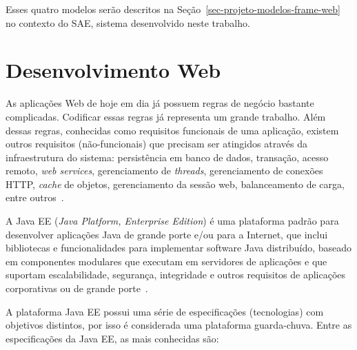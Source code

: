 Esses quatro modelos serão descritos na Seção~\ref{sec-projeto-modelos-frame-web} no contexto do SAE, sistema desenvolvido neste trabalho.







\section{Desenvolvimento Web}
\label{sec-referencial-desenvolvimento-web}

As aplicações Web de hoje em dia já possuem regras de negócio bastante complicadas. Codificar essas regras já representa um grande trabalho. Além dessas regras, conhecidas como requisitos funcionais de uma aplicação, existem outros requisitos (não-funcionais) que precisam ser atingidos através da infraestrutura do sistema: persistência em banco de dados, transação, acesso remoto, \textit{web services}, gerenciamento de \textit{threads}, gerenciamento de conexões HTTP, \textit{cache} de objetos, gerenciamento da sessão web, balanceamento de carga, entre outros~\cite{caelumDesenvolvimento}.

A Java EE (\textit{Java Platform, Enterprise Edition}) é uma plataforma padrão para desenvolver aplicações Java de grande porte e/ou para a Internet, que inclui bibliotecas e funcionalidades para implementar software Java distribuído, baseado em componentes modulares que executam em servidores de aplicações e que suportam escalabilidade, segurança, integridade e outros requisitos de aplicações corporativas ou de grande porte~\cite{thiagoJava}.

A plataforma Java EE possui uma série de especificações (tecnologias) com objetivos distintos, por isso é considerada uma plataforma guarda-chuva. Entre as especificações da Java EE, as mais conhecidas são:

